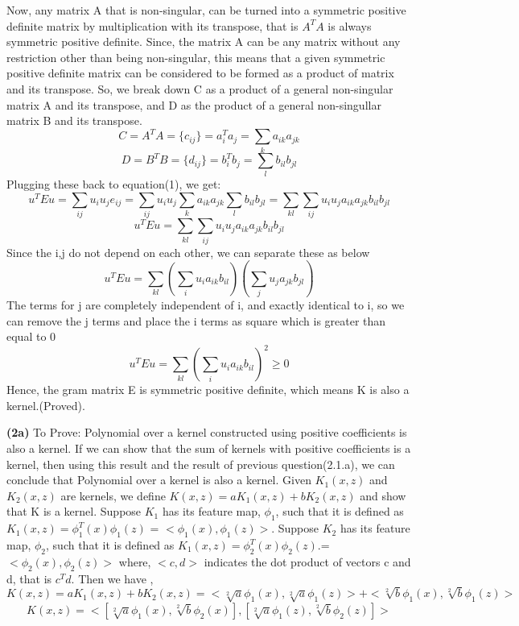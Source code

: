 \documentclass{article}
\renewcommand\part[1]{\vspace{.10in}\textbf{(#1)}}
\begin{document}
    Now, any matrix A that is non-singular, can be turned into a symmetric positive definite matrix by multiplication with its transpose, that is $A^TA$ is always symmetric positive definite. Since, the matrix A can be any matrix without any restriction other than being non-singular, this means that a given symmetric positive definite matrix can be considered to be formed as a product of  matrix and its transpose. So, we break down C as a product of a general non-singular matrix A and its transpose, and D as the product of a general non-singullar matrix B and its transpose. 
    \[C = A^TA = \{c_{ij}\} = a_{i}^Ta_j = \sum_{k} a_{ik}a_{jk} \]
    \[D = B^TB = \{d_{ij}\} = b_{i}^Tb_j = \sum_{l} b_{il}b_{jl} \]
   Plugging these back to equation(1), we get: 
    \[u^TEu = \sum_{ij} u_i u_j e_{ij} = \sum_{ij} u_i u_j \sum_{k} a_{ik}a_{jk} \sum_{l} b_{il}b_{jl} =\sum_{kl} \sum_{ij} u_i u_j a_{ik}a_{jk} b_{il}b_{jl}\] 
    \[u^TEu = \sum_{kl} \sum_{ij} u_i u_j a_{ik} a_{jk} b_{il} b_{jl}\]
    Since the i,j do not depend on each other, we can separate these as below
    \[u^TEu = \sum_{kl} ( \sum_{i} u_i a_{ik} b_{il}) (\sum_{j} u_j a_{jk} b_{jl})\]
    The terms for j are completely independent of i, and exactly identical to i, so we can remove the j terms and place the i terms as square which is greater than equal to 0
    \[u^TEu = \sum_{kl} ( \sum_{i} u_i a_{ik} b_{il})^2 \geq 0\]
    Hence, the gram matrix E is symmetric positive definite, which means K is also a kernel.(Proved). \newline

    \part{2a} To Prove: Polynomial over a kernel constructed using positive coefficients is also a kernel.\newline
    If we can show that the sum of kernels with positive coefficients is a kernel, then using this result and the result of previous question(2.1.a), we can conclude that Polynomial over a kernel is also a kernel. \newline
    Given $K_1(x,z)$ and $K_2(x,z)$ are kernels, we define $K(x,z) = a K_1(x,z) + b K_2(x,z)$ and show that K is a kernel. \newline
    Suppose $K_1$ has its feature map, $\phi_1$, such that it is defined as $K_1(x,z) = \phi_1^T(x)\phi_1(z)$ = $<\phi_1(x), \phi_1(z)>$.
    Suppose $K_2$ has its feature map, $\phi_2$, such that it is defined as $K_1(x,z) = \phi_2^T(x)\phi_2(z)$.=$<\phi_2(x), \phi_2(z)>$  \newline
    where, $<c,d>$ indicates the dot product of vectors c and d, that is $c^Td$. \newline
    Then we have , \newline
    \[K(x,z) = a K_1(x,z) + b K_2(x,z) = <\sqrt[2]{a}\phi_1(x), \sqrt[2]{a}\phi_1(z)> + <\sqrt[2]{b}\phi_1(x), \sqrt[2]{b}\phi_1(z)>\]
    \[K(x,z) = <[\sqrt[2]{a}\phi_1(x), \sqrt[2]{b}\phi_2(x)], [\sqrt[2]{a}\phi_1(z), \sqrt[2]{b}\phi_2(z)]>\]
\end{document}
